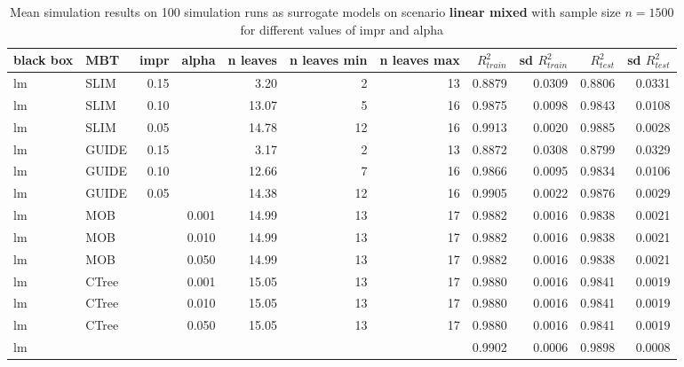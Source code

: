 \begin{table}
\begin{tabular}[t]{l|l|r|r|r|r|r|r|r|r|r}
\end{tabular}
\label{tab:app_linear_abrupt_5000}

\end{table}




\begin{table}

\caption{Mean simulation results on 100 simulation runs as surrogate models on scenario \textbf{linear mixed} with sample size $n=1500$ for different values of impr and alpha}
\centering \tiny
\begin{tabular}[t]{l|l|r|r|r|r|r|r|r|r|r}
\hline
black box & MBT & impr & alpha & n leaves & n leaves min & n leaves max &  $R^2_{train}$ & sd $R^2_{train}$ & $R^2_{test}$ & sd $R^2_{test}$\\
\hline
lm & SLIM & 0.15 & & 3.20 & 2 & 13 & 0.8879 & 0.0309 & 0.8806 & 0.0331\\
lm & SLIM & 0.10 & & 13.07 & 5 & 16 & 0.9875 & 0.0098 & 0.9843 & 0.0108\\
lm & SLIM & 0.05 & & 14.78 & 12 & 16 & 0.9913 & 0.0020 & 0.9885 & 0.0028\\
lm & GUIDE & 0.15 & & 3.17 & 2 & 13 & 0.8872 & 0.0308 & 0.8799 & 0.0329\\
lm & GUIDE & 0.10 & & 12.66 & 7 & 16 & 0.9866 & 0.0095 & 0.9834 & 0.0106\\
lm & GUIDE & 0.05 & & 14.38 & 12 & 16 & 0.9905 & 0.0022 & 0.9876 & 0.0029\\
lm & MOB & & 0.001 & 14.99 & 13 & 17 & 0.9882 & 0.0016 & 0.9838 & 0.0021\\
lm & MOB & & 0.010 & 14.99 & 13 & 17 & 0.9882 & 0.0016 & 0.9838 & 0.0021\\
lm & MOB & & 0.050 & 14.99 & 13 & 17 & 0.9882 & 0.0016 & 0.9838 & 0.0021\\
lm & CTree & & 0.001 & 15.05 & 13 & 17 & 0.9880 & 0.0016 & 0.9841 & 0.0019\\
lm & CTree & & 0.010 & 15.05 & 13 & 17 & 0.9880 & 0.0016 & 0.9841 & 0.0019\\
lm & CTree & & 0.050 & 15.05 & 13 & 17 & 0.9880 & 0.0016 & 0.9841 & 0.0019\\

\hline
lm & & & & & & & 0.9902 & 0.0006 & 0.9898 & 0.0008\\
\hline



\end{tabular}
\end{table}
